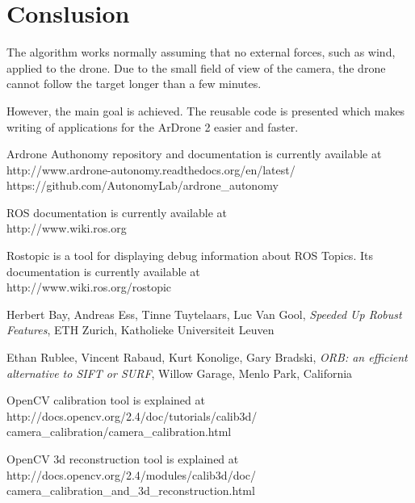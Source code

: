 \documentclass[12pt]{article}
\begin{document}
    \section{Conslusion}

    The algorithm works normally assuming that no external forces,
    such as wind, applied to the drone. Due to the small field of view
    of the camera, the drone cannot follow the target longer than
    a few minutes.

    However, the main goal is achieved. The reusable code is presented
    which makes writing of applications for the ArDrone 2 easier and faster.

    \newpage

    \setcounter{page}{1}

    \begin{thebibliography}{9}

Ardrone Authonomy repository and documentation is currently available at \\
http://www.ardrone-autonomy.readthedocs.org/en/latest/ \\
https://github.com/AutonomyLab/ardrone\_autonomy

ROS documentation is currently available at \\
http://www.wiki.ros.org

Rostopic is a tool for displaying debug information about ROS Topics.
Its documentation is currently available at \\
http://www.wiki.ros.org/rostopic

Herbert Bay, Andreas Ess, Tinne Tuytelaars, Luc Van Gool, \emph{Speeded Up Robust Features},
ETH Zurich, Katholieke Universiteit Leuven

Ethan Rublee, Vincent Rabaud, Kurt Konolige, Gary Bradski, \emph{ORB: an efficient alternative to SIFT or SURF},
Willow Garage, Menlo Park, California

OpenCV calibration tool is explained at \\
http://docs.opencv.org/2.4/doc/tutorials/calib3d/\\
camera\_calibration/camera\_calibration.html

OpenCV 3d reconstruction tool is explained at \\
http://docs.opencv.org/2.4/modules/calib3d/doc/\\
camera\_calibration\_and\_3d\_reconstruction.html


\end{thebibliography}
\end{document}
